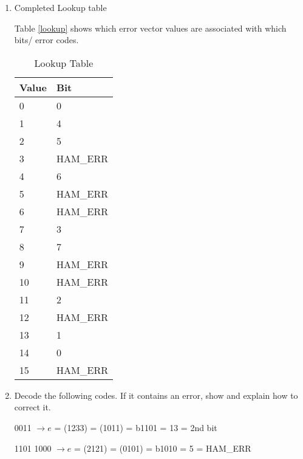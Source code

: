 \documentclass[12pt]{article}
\newenvironment{QandA}{\begin{enumerate}[label=\bfseries\alph*.]\bfseries}
{\end{enumerate}}
\newenvironment{answered}{\par\normalfont}{}
\begin{document}
\begin{QandA}

\item Completed Lookup table

	\begin{answered}

        Table \vref{lookup} shows which error vector values are associated with
        which bits/ error codes.

        \begin{table}[ht]
            \centering
            \begin{tabular}{l|l}
                \textbf{Value} & \textbf{Bit} \\ \hline
                0              & 0            \\
                1              & 4            \\
                2              & 5            \\
                3              & HAM\_ERR     \\
                4              & 6            \\
                5              & HAM\_ERR     \\
                6              & HAM\_ERR     \\
                7              & 3            \\
                8              & 7            \\
                9              & HAM\_ERR     \\
                10             & HAM\_ERR     \\
                11             & 2            \\
                12             & HAM\_ERR     \\
                13             & 1            \\
                14             & 0            \\
                15             & HAM\_ERR    
            \end{tabular}
            \caption{Lookup Table}\label{lookup}
        \end{table}

    \end{answered}

\item Decode the following codes. If it contains an error, show and explain
    how to correct it.

    \begin{answered}
        1110 0011 $\rightarrow e$ = (1233) = (1011) = b1101 = 13 = 2nd bit

        1101 1000 $\rightarrow e$ = (2121) = (0101) = b1010 = 5 = HAM\_ERR
    \end{answered}

\end{QandA}
\end{document}
